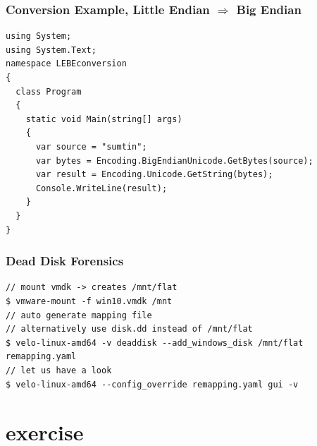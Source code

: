 \subsubsection*{Conversion Example, Little Endian $\Rightarrow$ Big Endian}
\begin{lstlisting}[basicstyle=\ttfamily]
using System;
using System.Text;
namespace LEBEconversion
{
  class Program
  {
    static void Main(string[] args)
    {
      var source = "sumtin";
      var bytes = Encoding.BigEndianUnicode.GetBytes(source);
      var result = Encoding.Unicode.GetString(bytes);
      Console.WriteLine(result);
    }
  }
}
\end{lstlisting}

\subsubsection*{Dead Disk Forensics}
\begin{lstlisting}[basicstyle=\ttfamily]
// mount vmdk -> creates /mnt/flat
$ vmware-mount -f win10.vmdk /mnt
// auto generate mapping file
// alternatively use disk.dd instead of /mnt/flat
$ velo-linux-amd64 -v deaddisk --add_windows_disk /mnt/flat remapping.yaml
// let us have a look
$ velo-linux-amd64 --config_override remapping.yaml gui -v
\end{lstlisting}

\section{exercise}
